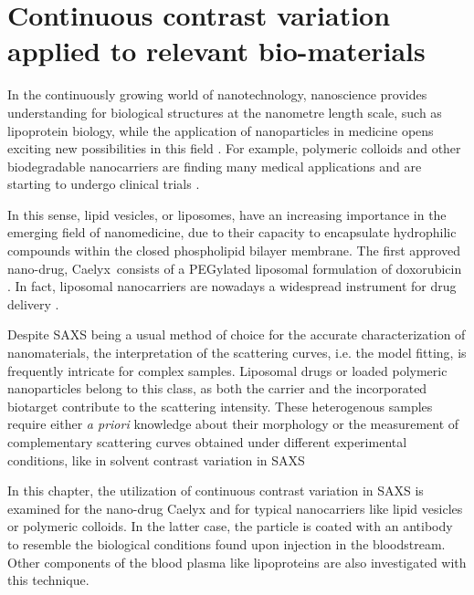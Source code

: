 \chapter{Continuous contrast variation applied to relevant bio-materials}
\label{chap:bio_applications}

In the continuously growing world of nanotechnology, nanoscience provides understanding for biological structures at the nanometre length scale, such as lipoprotein biology, while the application of nanoparticles in medicine opens exciting new possibilities in this field \citep{nie_nanotechnology_2007, sahoo_nanotech_2003, wickline_nanotechnology_2003, zhou_nano-enabled_2014, rosen_rise_2005}. For example, polymeric colloids and other biodegradable nanocarriers are finding many medical applications \citep{vicent_polymer_2006} and are starting to undergo clinical trials \citep{patel_polymeric_2012,beija_colloidal_2012,cabral_progress_2014}. 

In this sense, lipid vesicles, or liposomes, have an increasing importance in the emerging field of nanomedicine, due to their capacity to encapsulate hydrophilic compounds within the closed phospholipid bilayer membrane. The first approved nano-drug, Caelyx\textregistered\, consists of a PEGylated liposomal formulation of doxorubicin \citep{barenholz_doxil-first_2012}. In fact, liposomal nanocarriers are nowadays a widespread instrument for drug delivery \citep{perez-herrero_advanced_2015}.

Despite SAXS being a usual method of choice for the accurate characterization of nanomaterials, the interpretation of the scattering curves, i.e. the model fitting, is frequently intricate for complex samples. Liposomal drugs or loaded polymeric nanoparticles belong to this class, as both the carrier and the incorporated biotarget contribute to the scattering intensity. These heterogenous samples require either \emph{a priori} knowledge about their morphology or the measurement of complementary scattering curves obtained under different experimental conditions, like in solvent contrast variation in SAXS 

In this chapter, the utilization of continuous contrast variation in SAXS is examined for the nano-drug Caelyx and for typical nanocarriers like lipid vesicles or polymeric colloids. In the latter case, the particle is coated with an antibody to resemble the biological conditions found upon injection in the bloodstream. Other components of the blood plasma like lipoproteins are also investigated with this technique.


